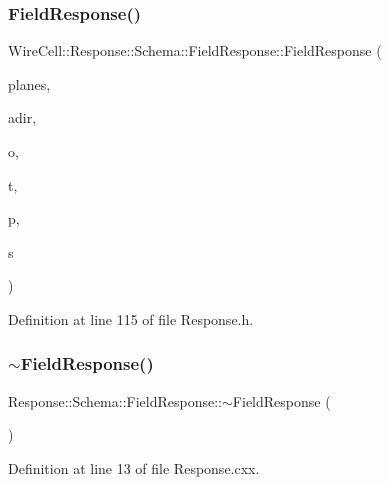 \subsubsection{\texorpdfstring{Field\+Response()}{FieldResponse()}\hspace{0.1cm}{\footnotesize\ttfamily [2/2]}}
{\footnotesize\ttfamily Wire\+Cell\+::\+Response\+::\+Schema\+::\+Field\+Response\+::\+Field\+Response (\begin{DoxyParamCaption}\item[{const std\+::vector$<$ \hyperlink{struct_wire_cell_1_1_response_1_1_schema_1_1_plane_response}{Plane\+Response} $>$ \&}]{planes,  }\item[{const \hyperlink{namespace_wire_cell_aa3c82d3ba85f032b0d278b7004846800}{Wire\+Cell\+::\+Vector} \&}]{adir,  }\item[{double}]{o,  }\item[{double}]{t,  }\item[{double}]{p,  }\item[{double}]{s }\end{DoxyParamCaption})\hspace{0.3cm}{\ttfamily [inline]}}



Definition at line 115 of file Response.\+h.

\mbox{\label{struct_wire_cell_1_1_response_1_1_schema_1_1_field_response_a1300de135b73edb353b1a0f25d27507f}} 
\subsubsection{\texorpdfstring{$\sim$\+Field\+Response()}{~FieldResponse()}}
{\footnotesize\ttfamily Response\+::\+Schema\+::\+Field\+Response\+::$\sim$\+Field\+Response (\begin{DoxyParamCaption}{ }\end{DoxyParamCaption})}



Definition at line 13 of file Response.\+cxx.



